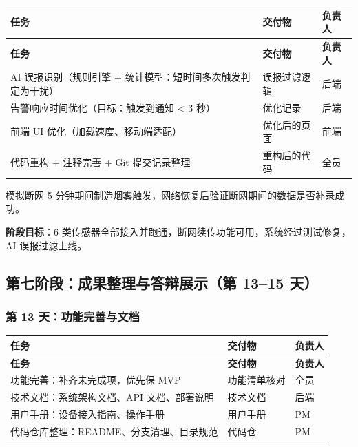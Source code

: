 \documentclass[UTF8,12pt,a4paper]{ctexart}
\begin{document}
\begin{longtable}{L{6cm}L{4.5cm}C{2.5cm}}
\toprule
\textbf{任务} & \textbf{交付物} & \textbf{负责人} \\
\midrule
\endfirsthead
\toprule
\textbf{任务} & \textbf{交付物} & \textbf{负责人} \\
\midrule
\endhead
\bottomrule
\endfoot

AI 误报识别（规则引擎 + 统计模型：短时间多次触发判定为干扰） & 误报过滤逻辑 & 后端 \\
\midrule
告警响应时间优化（目标：触发到通知 < 3 秒） & 优化记录 & 后端 \\
\midrule
前端 UI 优化（加载速度、移动端适配） & 优化后的页面 & 前端 \\
\midrule
代码重构 + 注释完善 + Git 提交记录整理 & 重构后的代码 & 全员 \\
\bottomrule
\end{longtable}

\begin{tcolorbox}[colback=lightblue,colframe=mainblue,arc=2mm,boxrule=0.8pt,title={\faCheckCircle\ 检查点 D12 晚}]
模拟断网 5 分钟期间制造烟雾触发，网络恢复后验证断网期间的数据是否补录成功。
\end{tcolorbox}

\textbf{阶段目标}：6 类传感器全部接入并跑通，断网续传功能可用，系统经过测试修复，AI 误报过滤上线。

\subsection{第七阶段：成果整理与答辩展示（第 13--15 天）}

\subsubsection{第 13 天：功能完善与文档}

\begin{longtable}{L{6cm}L{4.5cm}C{2.5cm}}
\toprule
\textbf{任务} & \textbf{交付物} & \textbf{负责人} \\
\midrule
\endfirsthead
\toprule
\textbf{任务} & \textbf{交付物} & \textbf{负责人} \\
\midrule
\endhead
\bottomrule
\endfoot

功能完善：补齐未完成项，优先保 MVP & 功能清单核对 & 全员 \\
\midrule
技术文档：系统架构文档、API 文档、部署说明 & 技术文档 & 后端 \\
\midrule
用户手册：设备接入指南、操作手册 & 用户手册 & PM \\
\midrule
代码仓库整理：README、分支清理、目录规范 & 代码仓 & PM \\
\bottomrule
\end{longtable}
\end{document}

